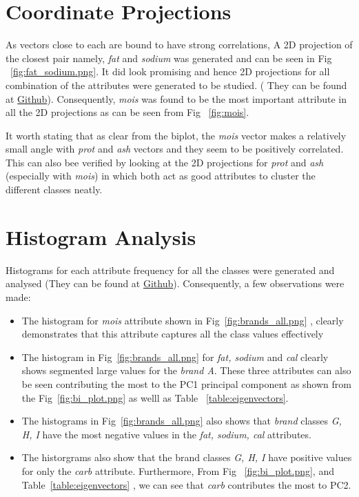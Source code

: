 \documentclass[preprint,12pt]{elsarticle}
\begin{document}
\section{Coordinate Projections}
\label{ss:CoordinateProjections}
 As vectors close to each are bound to have strong correlations, A 2D projection of the closest
pair namely, \textit{fat} and \textit{sodium} was generated and can be seen in Fig ~\ref{fig:fat_sodium.png}. It did look promising and hence 2D projections for all
combination of the attributes were generated to be studied. ( They can be found at \href{https://github.com/amar-laksh/UNI/tree/master/assignments/IDA/assignment/gen_images/attributes}{Github}). Consequently, \textit{mois} was found to be the most important attribute in all the 2D projections as can be seen from Fig ~\ref{fig:mois}.
\par
It worth stating that as clear from the biplot, the \textit{mois }vector makes a relatively small angle with \textit{prot }and \textit{ash }vectors and they seem to be positively
correlated. This can also bee verified by looking at the 2D projections for \textit{prot} and \textit{ash} (especially with \textit{mois}) in which both act as good attributes to cluster the different classes neatly.
\section{Histogram Analysis}
\label{ss:HistogramAnalysis}
Histograms for each attribute frequency for all the classes were generated and analysed (They can be found at \href{https://github.com/amar-laksh/UNI/tree/master/assignments/IDA/assignment/gen_images/histograms}{Github}). Consequently, a few observations were made:
\begin{itemize}
\item The histogram for \textit{mois} attribute shown in Fig~\ref{fig:brands_all.png} , clearly demonstrates that this attribute captures all the class values effectively
\item The histogram in Fig~\ref{fig:brands_all.png} for \textit{fat, sodium }and \textit{cal} clearly shows segmented large values for the \textit{brand A}. These three attributes can also be seen contributing the most to the PC1 principal component as shown from the Fig~\ref{fig:bi_plot.png} as welll as Table ~\ref{table:eigenvectors}.
\item The histograms in Fig~\ref{fig:brands_all.png} also shows that \textit{brand} classes \textit{G, H, I} have the most negative values in the \textit{fat, sodium, cal} attributes. \item The historgrams also show that the brand classes \textit{G, H, I} have positive values  for only the \textit{carb }attribute. Furthermore, From Fig ~\ref{fig:bi_plot.png},  and  Table~\ref{table:eigenvectors} , we can see that \textit{carb }  contributes the most to PC2.
\end{itemize}
\end{document}
